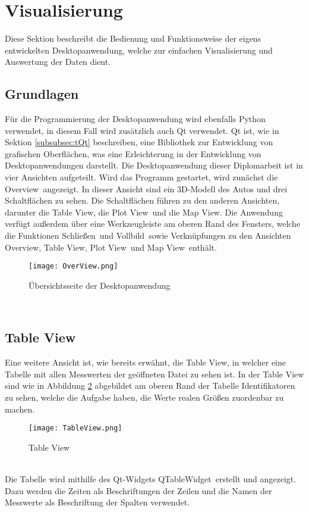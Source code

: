 \section{Visualisierung}
\label{sec:DesktopApp}
Diese Sektion beschreibt die Bedienung und Funktionsweise der eigens entwickelten Desktopanwendung, welche zur einfachen Visualisierung und Auswertung der Daten dient.
\subsection{Grundlagen}
\label{subsec:VisGrundlagen}
Für die Programmierung der Desktopanwendung wird ebenfalls Python verwendet, in diesem Fall wird zusätzlich auch Qt verwendet. Qt ist, wie in Sektion \ref{subsubsec:tQt} beschreiben, eine Bibliothek zur Entwicklung von grafischen Oberflächen, was eine Erleichterung in der Entwicklung von Desktopanwendungen darstellt. Die Desktopanwendung dieser Diplomarbeit ist in vier Ansichten aufgeteilt. Wird das Programm gestartet, wird zunächst die \glqq Overview\grqq\ angezeigt. In dieser Ansicht sind ein \ac{3D}-Modell des Autos und drei Schaltflächen zu sehen. Die Schaltflächen führen zu den anderen Ansichten, darunter die \glqq Table View\grqq , die \glqq Plot View\grqq \ und die \glqq Map View\grqq . Die Anwendung verfügt außerdem über eine Werkzeugleiste am oberen Rand des Fensters, welche die Funktionen \glqq Schließen\grqq\ und \glqq Vollbild\grqq\ sowie Verknüpfungen zu den Ansichten \glqq Overview\grqq , \glqq Table View\grqq , \glqq Plot View\grqq\  und \glqq Map View\grqq\ enthält.
\begin{figure}[h]
\centering
\texttt{[image: OverView.png]}
\caption{Übersichtsseite der Desktopanwendung}
\label{fig:Overview}
\end{figure}
\\
\subsection{Table View}
\label{subsec:VisTableView}
Eine weitere Ansicht ist, wie bereits erwähnt, die \glqq Table View\grqq , in welcher eine Tabelle mit allen Messwerten der geöffneten Datei zu sehen ist. In der Table View sind wie in Abbildung \ref{fig:TableView} abgebildet am oberen Rand der Tabelle Identifikatoren zu sehen, welche die Aufgabe haben, die Werte realen Größen zuordenbar zu machen.
\begin{figure}[h]
\centering
\texttt{[image: TableView.png]}
\caption{Table View}
\label{fig:TableView}
\end{figure}
\\
Die Tabelle wird mithilfe des Qt-Widgets \glqq QTableWidget\grqq\ erstellt und angezeigt. Dazu werden die Zeiten als Beschriftungen der Zeilen und die Namen der Messwerte als Beschriftung der Spalten verwendet. 

